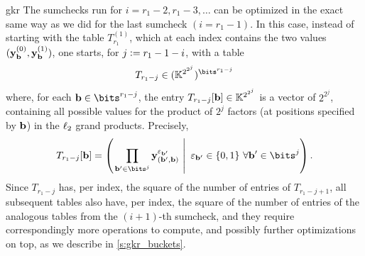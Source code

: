 \begin{lncsappendix}{gkr}
The sumchecks run for $i=r_1-2, r_1-3,\ldots$ can be optimized in the exact same way as we did for the last sumcheck $(i=r_1-1)$. In this case, instead of starting with the table $T_{r_1}^{(1)}$, which at each index contains the two values $(\mathbf{y}_{\mathbf{b}}^{(0)}, \mathbf{y}_{\mathbf{b}}^{(1)})$, one starts, for $j{\;\vcentcolon=\;} r_1-1-i$, with a table
%
$$
T_{r_1-j} \in (\KK^{2^{2^{j}}})^{\bits^{r_1-j}}
$$
%
where, for each $\bb \in \bits^{r_1-j}$, the entry $T_{r_1-j}[\mathbf{b}]\in \mathbb{K}^{2^{2^{j}}}$ is a vector of $2^{2^j}$, containing all possible values for the product of $2^j$ factors (at positions specified by $\mathbf{b}$)  in the $\ell_2$ grand products. Precisely,
$$T_{r_1-j}[\bb]=\left(\left.\prod_{\bb' \in \bits^j}\yy_{(\bb',\bb)}^{\eps_{\bb'}} \ \right| \ \eps_{\bb'}\in \{0,1\} \ \forall \bb'\in \bits^j\right).$$
 Since $T_{r_1-j}$ has, per index, the square of the number of entries of $T_{r_1-j+1}$, all subsequent tables also have, per index, the square of the number of entries of the analogous tables from the $(i+1)$-th sumcheck, and they require correspondingly more operations to compute, and possibly further optimizations on top, as we describe in \cref{s:gkr_buckets}.



\end{lncsappendix}
